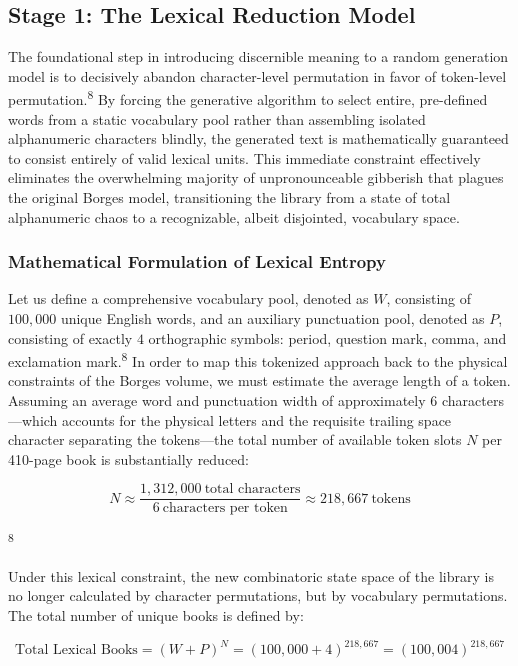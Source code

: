 \documentclass[
  11pt,
  a4paper,
]{article}
\begin{document}
\subsection{Stage 1: The Lexical Reduction Model}\label{stage-1-the-lexical-reduction-model}

The foundational step in introducing discernible meaning to a random generation model is to decisively abandon character-level permutation in favor of token-level permutation.\textsuperscript{8} By forcing the generative algorithm to select entire, pre-defined words from a static vocabulary pool rather than assembling isolated alphanumeric characters blindly, the generated text is mathematically guaranteed to consist entirely of valid lexical units. This immediate constraint effectively eliminates the overwhelming majority of unpronounceable gibberish that plagues the original Borges model, transitioning the library from a state of total alphanumeric chaos to a recognizable, albeit disjointed, vocabulary space.

\subsubsection{Mathematical Formulation of Lexical Entropy}\label{mathematical-formulation-of-lexical-entropy}

Let us define a comprehensive vocabulary pool, denoted as \(W\), consisting of \(100,000\) unique English words, and an auxiliary punctuation pool, denoted as \(P\), consisting of exactly \(4\) orthographic symbols: period, question mark, comma, and exclamation mark.\textsuperscript{8} In order to map this tokenized approach back to the physical constraints of the Borges volume, we must estimate the average length of a token. Assuming an average word and punctuation width of approximately 6 characters---which accounts for the physical letters and the requisite trailing space character separating the tokens---the total number of available token slots \(N\) per 410-page book is substantially reduced:

\[
N \approx \frac{1,312,000\ \text{total characters}}{6\ \text{characters per token}} \approx 218,667\ \text{tokens}
\]

\textsuperscript{8}

Under this lexical constraint, the new combinatoric state space of the library is no longer calculated by character permutations, but by vocabulary permutations. The total number of unique books is defined by:

\[
\text{Total Lexical Books}=(W+P)^N=(100,000+4)^{218,667}=(100,004)^{218,667}
\]
\end{document}
